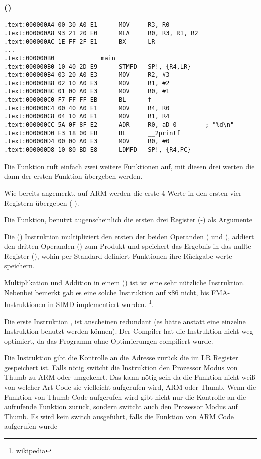 \subsubsection{\NonOptimizingKeilVI (\ARMMode)}

\begin{lstlisting}[style=customasmARM]
.text:000000A4 00 30 A0 E1      MOV     R3, R0
.text:000000A8 93 21 20 E0      MLA     R0, R3, R1, R2
.text:000000AC 1E FF 2F E1      BX      LR
...
.text:000000B0             main
.text:000000B0 10 40 2D E9      STMFD   SP!, {R4,LR}
.text:000000B4 03 20 A0 E3      MOV     R2, #3
.text:000000B8 02 10 A0 E3      MOV     R1, #2
.text:000000BC 01 00 A0 E3      MOV     R0, #1
.text:000000C0 F7 FF FF EB      BL      f
.text:000000C4 00 40 A0 E1      MOV     R4, R0
.text:000000C8 04 10 A0 E1      MOV     R1, R4
.text:000000CC 5A 0F 8F E2      ADR     R0, aD_0        ; "%d\n"
.text:000000D0 E3 18 00 EB      BL      __2printf
.text:000000D4 00 00 A0 E3      MOV     R0, #0
.text:000000D8 10 80 BD E8      LDMFD   SP!, {R4,PC}
\end{lstlisting}

Die \main Funktion ruft einfach zwei weitere Funktionen auf, mit diesen drei werten die dann
der ersten Funktion übergeben werden.

Wie bereits angemerkt, auf ARM werden die erste 4 Werte in den ersten vier Registern übergeben (-).

Die \ttf Funktion, benutzt augenscheinlich die ersten drei Register (-) als Argumente


Die  ()
Instruktion multipliziert den ersten der beiden Operanden ( und ), addiert den dritten Operanden
() zum Produkt und speichert das Ergebnis in das nullte Register (), wohin per Standard definiert
Funktionen ihre Rückgabe werte speichern.

Multiplikation und Addition in einem ()
ist ist eine sehr nützliche Instruktion. Nebenbei bemerkt gab es eine solche Instruktion 
auf x86 nicht, bis FMA-Instruktionen in SIMD implementiert wurden.
\footnote{\href{http://go.yurichev.com/17103}{wikipedia}}.

Die erste Instruktion ,
ist anscheinen redundant (es hätte anstatt eine einzelne  Instruktion benutzt werden können).
Der Compiler hat die Instruktion nicht weg optimiert, da das Programm ohne Optimierungen compiliert wurde.


Die  Instruktion gibt die Kontrolle an die Adresse zurück die im \ac{LR} Register gespeichert ist.
Falls nötig switcht die Instruktion den Prozessor Modus von Thumb zu ARM oder umgekehrt.
Das kann nötig sein da die \ttf Funktion nicht weiß von welcher Art Code sie vielleicht aufgerufen wird,
ARM oder Thumb.
Wenn die Funktion von Thumb Code aufgerufen wird gibt  nicht nur 
die Kontrolle an die aufrufende Funktion zurück, sondern switcht auch den Prozessor Modus auf 
Thumb. Es wird kein switch ausgeführt, falls die Funktion von ARM Code aufgerufen wurde  
